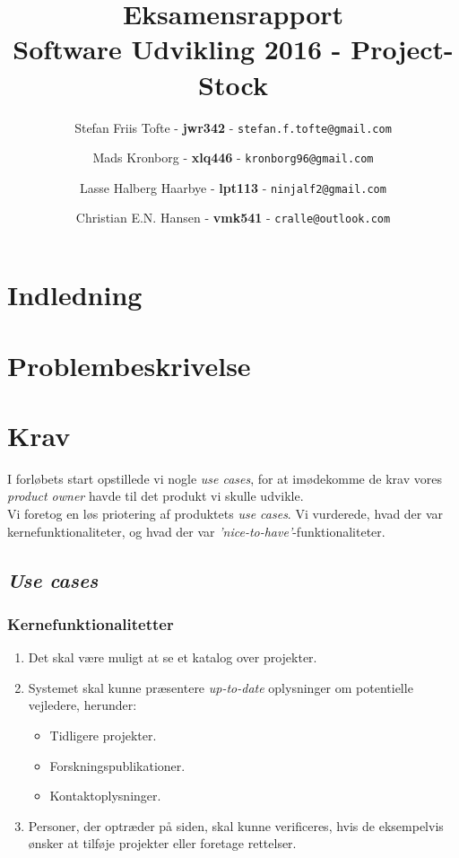 \documentclass[12pt]{article}
\title{
  \vspace{3cm}
  \Huge{Eksamensrapport} \\
  \Large{Software Udvikling 2016 - Project-Stock}
}
\author{
	\Large{Stefan Friis Tofte} - \textbf{jwr342} - \texttt{stefan.f.tofte@gmail.com}
	\and
	\Large{Mads Kronborg} - \textbf{xlq446} - \texttt{kronborg96@gmail.com}
	\and
	\Large{Lasse Halberg Haarbye} - \textbf{lpt113} - \texttt{ninjalf2@gmail.com}
	\and
	\Large{Christian E.N. Hansen} - \textbf{vmk541} - \texttt{cralle@outlook.com}
}
\def \ColourPDF {../include/ku-farve}
\def \TitlePDF {../include/ku-en}  %
\begin{document}


\clearpage\maketitle
\thispagestyle{empty}

\newpage
\tableofcontents
\newpage

\section{Indledning}
\label{sec:indledning}

\section{Problembeskrivelse}
\label{sec:problem}

\section{Krav}
I forløbets start opstillede vi nogle \textit{use cases}, for at imødekomme de krav vores \textit{product owner} havde til det produkt vi skulle udvikle. \\
Vi foretog en løs priotering af produktets \textit{use cases}. Vi vurderede, hvad der var kernefunktionaliteter, og hvad der var \textit{'nice-to-have'}-funktionaliteter.

\subsection{\textit{Use cases}}
\label{sec:krav}

\subsubsection{Kernefunktionalitetter}
\begin{enumerate}
	\item Det skal være muligt at se et katalog over projekter.
	\item Systemet skal kunne præsentere \textit{up-to-date} oplysninger om potentielle vejledere, herunder:
	\begin{itemize}
		\item Tidligere projekter.
		\item Forskningspublikationer.
		\item Kontaktoplysninger.
	\end{itemize}
	\item Personer, der optræder på siden, skal kunne verificeres, hvis de eksempelvis ønsker at tilføje projekter eller foretage rettelser.
\end{enumerate}
\end{document}
